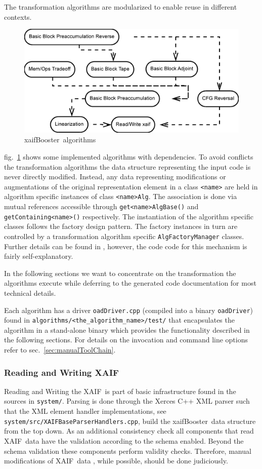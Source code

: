 \documentclass{book}
\newcommand{\xaif}{XAIF}
\newcommand{\xaifBooster}{xaifBooster}
\newcommand{\refsec}[1]{{sec.~\ref{#1}}}
\newcommand{\reffig}[1]{{fig.~\ref{#1}}}
\begin{document}
The transformation algorithms are modularized to enable reuse in different 
contexts. 
\begin{figure}
  \centering \includegraphics[width=.45\textwidth]{allAlgs}
  \caption{\xaifBooster\ algorithms} \label{fig:allAlgs}
\end{figure}
\reffig{fig:allAlgs} shows some implemented algorithms with dependencies.
To avoid conflicts the transformation algorithms the data structure representing the input code  
is never directly modified. 
Instead, any data representing modifications or augmentations of the 
original representation element in a class \lstinline{<name>}
are held in algorithm specific instances of class \lstinline{<name>Alg}.
The association is done via mutual references accessible 
through \lstinline{get<name>AlgBase()} and \lstinline{getContaining<name>()} respectively.
The instantiation of the algorithm specific classes follows 
the factory design pattern. The factory instances in turn are controlled 
by a transformation algorithm specific \lstinline{AlgFactoryManager} classes. 
Further details can be found in \cite{Utke2003STI}, however, the code 
code for this mechanism is fairly self-explanatory.  

In the following sections we want to concentrate on the transformation 
the algorithms execute while deferring to the generated code 
documentation for most technical details.

Each algorithm has a driver \lstinline{oadDriver.cpp} (compiled into a binary \lstinline{oadDriver}) 
found in \lstinline{algorithms/<the_algorithm_name>/test/} 
that encapsulates the algorithm 
in a stand-alone binary which provides the functionality described 
in the following 
sections. For details on the invocation and command line options refer to 
\refsec{sec:manualToolChain}.

\subsubsection{Reading and Writing \xaif}\label{sec:readWriteXaif}
Reading and Writing the \xaif\ is part of basic infrastructure
found in the sources in \lstinline{system/}.
Parsing is done through the Xerces C++ XML parser \cite{xercesWeb}
such that the XML element handler implementations, see \lstinline{system/src/XAIFBaseParserHandlers.cpp},
build the \xaifBooster\ data 
structure from the top down. 
As an additional consistency check all components that read \xaif\ data 
have the validation according to the schema enabled. Beyond the schema 
validation these components perform validity checks. Therefore, 
manual modifications of \xaif\ data , while possible, should 
be done judiciously. 
\end{document}
